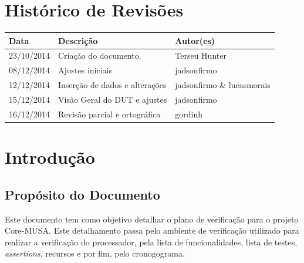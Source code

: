 \documentclass{article}
\begin{document}
\capa

  \section*{\center Histórico de Revisões}
  \vspace*{1cm}
  \begin{center} %
    \begin{longtable}[pos]{|m{2cm} | m{7.2cm} | m{3.8cm}|} 
      \hline %
      \cellcolor[gray]{0.9}
      \textbf{Data} & \cellcolor[gray]{0.9}\textbf{Descrição} & \cellcolor[gray]{0.9}\textbf{Autor(es)}\\ \hline
      \hline
      \small 23/10/2014 & \small Criação do documento. & \small Terseu Hunter \\ \hline
      \hline
      \small 08/12/2014 & \small Ajustes iniciais & \small jadsonfirmo \\ \hline 
      \small 12/12/2014 & \small Inserção de dados e alterações & \small jadsonfirmo \& lucasmorais \\ \hline
      \small 15/12/2014 & \small Visão Geral do DUT e ajustes & \small jadsonfirmo\\ \hline
      \small 16/12/2014 & \small Revisão parcial e ortográfica & \small gordinh\\ \hline
    \end{longtable}
  \end{center}

  \newpage
  \tableofcontents
  \newpage

  \section{Introdução}

	\subsection{Propósito do Documento}
	Este documento tem como objetivo detalhar o plano de verificação para o projeto Core-MUSA. Este detalhamento passa pelo ambiente de verificação utilizado para realizar a verificação do processador, pela lista de funcionalidades, lista de testes, \textit{assertions}, recursos e por fim, pelo cronogograma.
	
\end{document}
